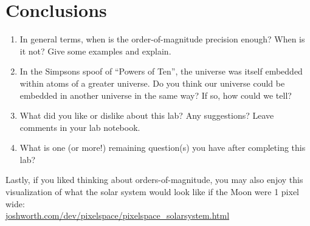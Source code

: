 \documentclass[11pt]{article}%
\begin{document}

\section{Conclusions}

\begin{enumerate}
    \item In general terms, when is the order-of-magnitude precision enough?
    When is it not?  Give some examples and explain.
    \item In the Simpsons spoof of ``Powers of Ten'', the universe was itself
    embedded within atoms of a greater universe.  Do you think our universe
    could be embedded in another universe in the same way?  If so, how could we
    tell?
    \item What did you like or dislike about this lab? Any suggestions? Leave comments in your lab notebook.
    \item What is one (or more!) remaining question(s) you have after completing this lab?
    
\end{enumerate}

Lastly, if you liked thinking about orders-of-magnitude, you may also enjoy
this visualization of what the solar system would look like if the Moon were 1
pixel wide:\\
\href{http://joshworth.com/dev/pixelspace/pixelspace_solarsystem.html}{joshworth.com/dev/pixelspace/pixelspace\_solarsystem.html}
\end{document}
